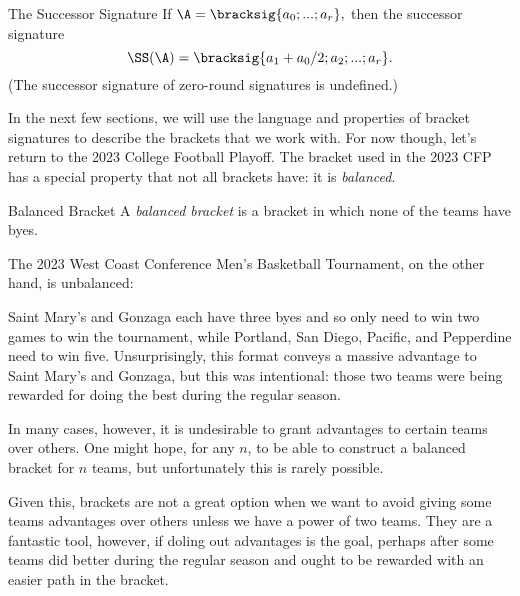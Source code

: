 {\begin{definition}{The Successor Signature}{}
    If $\A = \bracksig{a_0; ...; a_r},$ then the successor signature $$\SS(\A) = \bracksig{a_1 + a_0/2; a_2; ...; a_r}.$$ (The successor signature of zero-round signatures is undefined.)
\end{definition}

In the next few sections, we will use the language and properties of bracket signatures to describe the brackets that we work with. For now though, let's return to the 2023 College Football Playoff. The bracket used in the 2023 CFP has a special property that not all brackets have: it is \textit{balanced}.

\begin{definition}{Balanced Bracket}{}
    A \textit{balanced bracket} is a bracket in which none of the teams have byes.
\end{definition} 

The 2023 West Coast Conference Men's Basketball Tournament, on the other hand, is unbalanced:

Saint Mary's and Gonzaga each have three byes and so only need to win two games to win the tournament, while Portland, San Diego, Pacific, and Pepperdine need to win five. Unsurprisingly, this format conveys a massive advantage to Saint Mary's and Gonzaga, but this was intentional: those two teams were being rewarded for doing the best during the regular season.

In many cases, however, it is undesirable to grant advantages to certain teams over others. One might hope, for any $n$, to be able to construct a balanced bracket for $n$ teams, but unfortunately this is rarely possible.


Given this, brackets are not a great option when we want to avoid giving some teams advantages over others unless we have a power of two teams. They are a fantastic tool, however, if doling out advantages is the goal, perhaps after some teams did better during the regular season and ought to be rewarded with an easier path in the bracket.
}
